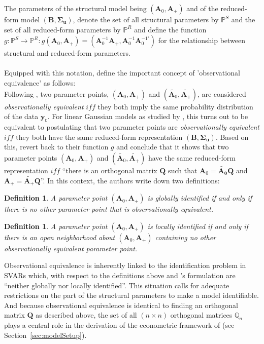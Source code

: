\documentclass[a4paper,11pt,listof=nochaptergap,oneside,pointednumbers,bibtotoc,bigheadings,liststotoc,hidelinks]{scrbook}
\theoremstyle{mysatz}
\theoremstyle{mydefinition}
\newtheorem{defi}[satz]{Definition}
\theoremstyle{mytheorem}
\theoremstyle{mybemerkung}
\newcommand{\vect}[1]{\boldsymbol{\mathbf{#1}}}
\begin{document}
The parameters of the structural model being $(\vect{A}_0, \vect{A}_+)$ and of the reduced-form model $(\vect{B}, \vect{\Sigma_u})$, \citet{rubioetal:10} denote the set of all structural parameters by $\mathbb{P}^S$ and the set of all reduced-form parameters by $\mathbb{P}^R$ and define the function $g: \mathbb{P}^S \to \mathbb{P}^R: g(\vect{A}_0, \vect{A}_+) = (\vect{A}_0^{-1}\vect{A}_+, \vect{A}_0^{-1}\vect{A}_0^{-1'})$ for the relationship between structural and reduced-form parameters.\\
\\
Equipped with this notation, \citet{rubioetal:10} define the important concept of 'observational equivalence' as follows: \\
Following \citet{rothenberg:71}, two parameter points, $(\vect{A}_0, \vect{A}_+)$ and $(\widetilde{\vect{A}_0}, \widetilde{\vect{A}_+})$, are considered \textit{observationally equivalent} $iff$ they both imply the same probability distribution of the data $\vect{y_t}$. For linear Gaussian models as studied by \citet{rubioetal:10}, this turns out to be equivalent to postulating that two parameter points are \textit{observationally equivalent} $iff$ they both have the same reduced-form representation $(\vect{B}, \vect{\Sigma_u})$. Based on this, \citet{rubioetal:10} revert back to their function $g$ and conclude that it shows that two parameter points $(\vect{A}_0, \vect{A}_+)$ and $(\widetilde{\vect{A}_0}, \widetilde{\vect{A}_+})$ have the same reduced-form representation $iff$ ``there is an orthogonal matrix $\vect{Q}$ such that $\vect{A}_0 = \vect{\widetilde{\vect{A}_0}}\vect{Q}$ and $\vect{A}_+ = \widetilde{\vect{A}_+} \vect{Q}$''. In this context, the authors write down two definitions:
\begin{defi}
A parameter point $(\vect{A}_0, \vect{A}_+)$ is globally identified if and only if there is no other parameter point that is observationally equivalent.
\end{defi}
\begin{defi}
A parameter point $(\vect{A}_0, \vect{A}_+)$ is locally identified if and only if there is an open neighborhood about $(\vect{A}_0, \vect{A}_+)$ containing no other observationally equivalent parameter point.
\end{defi}

Observational equivalence is inherently linked to the identification problem in SVARs which, with respect to the definitions above and \citet{rubioetal:10}'s formulation are ``neither globally nor locally identified''. This situation calls for adequate restrictions on the part of the structural parameters to make a model identifiable. And because observational equivalence is identical to finding an orthogonal matrix $\vect{Q}$ as described above, the set of all $(n \times n)$ orthogonal matrices $\mathbb{Q}_n$ plays a central role in the derivation of the econometric framework of \citet{ludvigsonetal:19} (see Section~\ref{sec:modelSetup}).\\
	
\end{document}
